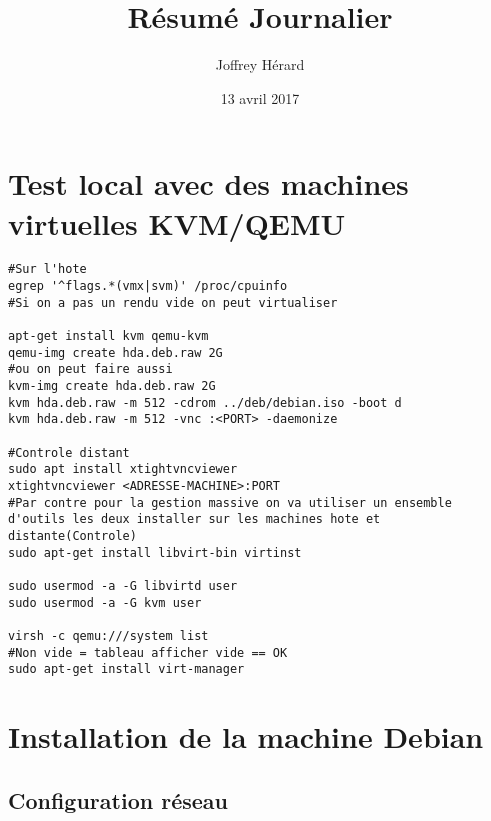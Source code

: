 \documentclass[french]{article}
\begin{document}
\title{Résumé Journalier}
\author{Joffrey Hérard}
\date{13 avril 2017} 

\maketitle
\section{Test local avec des machines virtuelles KVM/QEMU}
\begin{verbatim} 
#Sur l'hote
egrep '^flags.*(vmx|svm)' /proc/cpuinfo
#Si on a pas un rendu vide on peut virtualiser

apt-get install kvm qemu-kvm
qemu-img create hda.deb.raw 2G
#ou on peut faire aussi 
kvm-img create hda.deb.raw 2G
kvm hda.deb.raw -m 512 -cdrom ../deb/debian.iso -boot d
kvm hda.deb.raw -m 512 -vnc :<PORT> -daemonize 

#Controle distant 
sudo apt install xtightvncviewer
xtightvncviewer <ADRESSE-MACHINE>:PORT
#Par contre pour la gestion massive on va utiliser un ensemble d'outils les deux installer sur les machines hote et distante(Controle)
sudo apt-get install libvirt-bin virtinst

sudo usermod -a -G libvirtd user
sudo usermod -a -G kvm user

virsh -c qemu:///system list 
#Non vide = tableau afficher vide == OK 
sudo apt-get install virt-manager
\end{verbatim} 

\newpage
\section{Installation de la machine Debian}

\subsection{Configuration réseau}
\end{document}
